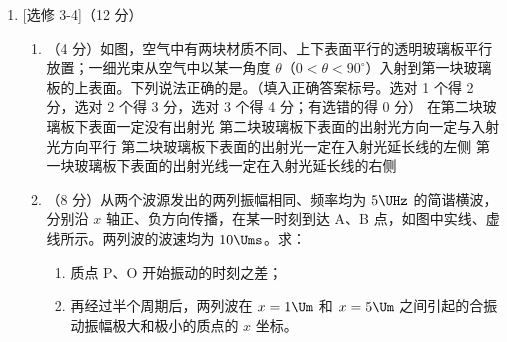 \documentclass[\gkver]{gaokaozhenti}
\begin{document}
\begin{enumerate}
{（2）设玻璃管横截面积为 $S$，初状态气体压强为 $p_{1}=p_{0}+h_{1}=76\UcmHg+5\UcmHg=81\UcmHg$①，气柱体积为 $V_{1}=l_{1}S=25S$②。

旋转 $180^{\circ}$ 后，设 AB 管中气柱长度增加 $\Delta h$，假设 AB 管中液面高于 CD 管中液面，即 $\Delta h<\frac{h_{1}}{2}=2.5\Ucm$。由几何知识可知两侧液面高度差 $h_{2}=h_{1}-2\Delta h=5-2\Delta h$③，气体压强为 $p_{2}=p_{0}-h_{2}$④，气柱体积为 $V_{2}=(l_{1}+\Delta h)S=(25+\Delta h)S$⑤。

温度一定，由玻意耳定律得 $p_{1}V_{1}=p_{2}V_{2}$⑥，联立①～⑥式得 $(p_{0}+h_{1})l_{1}S=(p_{0}-h_{1}+2\Delta h)(l_{1}+\Delta h)S$⑦。

将题中所给数据代入⑦式，解方程可得 $\Delta h=2\Ucm$ 或 $\Delta h=-62.5\Ucm$（不合题意舍去），则此时两管高度差 $h_{2}=h_{1}-2\Delta h=1\Ucm$，且 AB 管中液面高于 CD 管。
}

\item
{}[选修 3-4]（12 分）
\begin{enumerate}
	\item
	（4 分）如图，空气中有两块材质不同、上下表面平行的透明玻璃板平行放置；一细光束从空气中以某一角度 $\theta$（$0<\theta<90^{\circ}$）入射到第一块玻璃板的上表面。下列说法正确的是。（填入正确答案标号。选对 1 个得 2 分，选对 2 个得 3 分，选对 3 个得 4 分；有选错的得 0 分）
	{在第二块玻璃板下表面一定没有出射光}
	{第二块玻璃板下表面的出射光方向一定与入射光方向平行}
	{第二块玻璃板下表面的出射光一定在入射光延长线的左侧}
	{第一块玻璃板下表面的出射光线一定在入射光延长线的右侧}
	\item
	（8 分）从两个波源发出的两列振幅相同、频率均为 $5\UHz$ 的简谐横波，分别沿 $x$ 轴正、负方向传播，在某一时刻到达 A、B 点，如图中实线、虚线所示。两列波的波速均为 $10\Ums$。求：
	\begin{enumerate}[label=(\roman*)]
		\item
		质点 P、O 开始振动的时刻之差；
		\item
		再经过半个周期后，两列波在 $x=1\Um$ 和 $x=5\Um$ 之间引起的合振动振幅极大和极小的质点的 $x$ 坐标。
	\end{enumerate}
\end{enumerate}
\end{enumerate}
\end{document}
